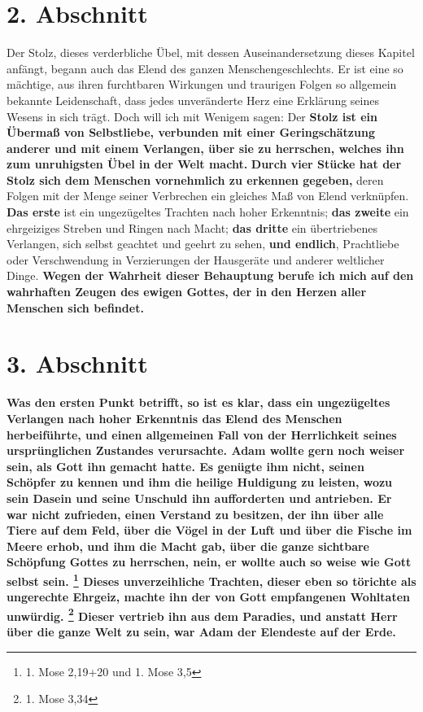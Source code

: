 \section{2. Abschnitt} \label{kap7_ab2}

Der Stolz, dieses verderbliche Übel, mit dessen Auseinandersetzung
dieses
Kapitel anfängt, begann auch das Elend des ganzen Menschengeschlechts. Er ist
eine so mächtige, aus ihren furchtbaren Wirkungen und traurigen Folgen so
allgemein bekannte Leidenschaft, dass jedes unveränderte Herz eine Erklärung
seines Wesens in sich trägt. Doch will ich mit Wenigem sagen: Der \textbf{Stolz
ist ein Übermaß von Selbstliebe, verbunden mit einer Geringschätzung
anderer und mit einem Verlangen, über sie zu
herrschen, welches ihn zum unruhigsten Übel in der
Welt macht.} \textbf{Durch vier Stücke hat der Stolz sich dem Menschen
vornehmlich zu
erkennen gegeben,} deren Folgen mit der Menge seiner Verbrechen ein gleiches Maß
von Elend verknüpfen. \textbf{Das erste} ist ein ungezügeltes Trachten nach
hoher
Erkenntnis; \textbf{das zweite} ein ehrgeiziges Streben und
Ringen nach Macht; \textbf{das dritte} ein übertriebenes Verlangen,
sich selbst geachtet und geehrt zu sehen,
\textbf{und endlich}, Prachtliebe oder Verschwendung in
Verzierungen der Hausgeräte und anderer weltlicher Dinge. \textbf{Wegen der
Wahrheit dieser Behauptung berufe ich mich auf den wahrhaften Zeugen des ewigen
Gottes, der in den Herzen aller Menschen
sich befindet.}

\section{3. Abschnitt} \label{kap7_ab3}

\textbf{Was den ersten Punkt betrifft, so ist es
klar, dass ein ungezügeltes Verlangen
nach hoher Erkenntnis
 das Elend des Menschen
herbeiführte, und einen allgemeinen
Fall von der Herrlichkeit seines ursprünglichen Zustandes verursachte.
   Adam
wollte gern noch weiser sein, als Gott ihn gemacht hatte. Es genügte ihm nicht,
seinen Schöpfer zu kennen und ihm die heilige Huldigung zu leisten, wozu sein
Dasein und seine Unschuld ihn aufforderten und antrieben. Er war nicht
zufrieden, einen Verstand zu besitzen, der ihn über alle
Tiere auf dem Feld,
über die Vögel in der Luft und über die Fische im Meere erhob, und ihm die Macht
gab, über die ganze sichtbare Schöpfung Gottes zu herrschen, nein, er wollte
auch so weise wie Gott selbst sein.
\footnote{1. Mose 2,19+20 und 1. Mose 3,5}
Dieses unverzeihliche Trachten, dieser eben so törichte als ungerechte
Ehrgeiz, machte
ihn der von Gott empfangenen Wohltaten unwürdig.
\footnote{1. Mose 3,34}
Dieser vertrieb ihn aus dem Paradies, und
anstatt Herr über die ganze Welt zu sein, war Adam der Elendeste auf der Erde.}

